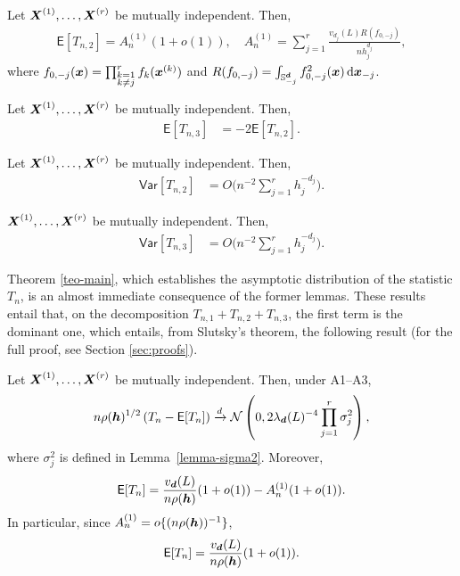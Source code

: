\documentclass[oneside,11pt]{article}
\begin{document}
\begin{lemma}\label{lemma-in2-e}
    Let $\boldsymbol{X}^{(1)}, \dots, \boldsymbol{X}^{(r)}$ be mutually independent. Then,
    \begin{align*}
    \mathsf{E}[T_{n,2}]=A_n^{(1)}(1+o(1))%
    ,\quad A_n^{(1)}=\sum_{j=1}^r \frac{v_{d_j}(L)R(f_{0,-j})}{nh_j^{d_j}},
\end{align*}
where $f_{0,-j}(\boldsymbol{x})=\prod_{\substack{k=1\\k\neq j}}^r f_k(\boldsymbol{x}^{(k)})$ and $R(f_{0,-j})=\int_{\mathbb{S}^{\boldsymbol{d}}_{-j}} f_{0,-j}^2(\boldsymbol{x})\,\mathrm{d} \boldsymbol{x}_{-j}$.
\end{lemma}

\begin{lemma}\label{lemma-in3-e}
    Let $\boldsymbol{X}^{(1)}, \dots, \boldsymbol{X}^{(r)}$ be mutually independent. Then,
    \begin{align*}
        \mathsf{E} [T_{n,3}] &=  -2 \mathsf{E} [T_{n,2}].
    \end{align*}
\end{lemma}

\begin{lemma}\label{lemma-var-tn2}
    Let $\boldsymbol{X}^{(1)}, \dots, \boldsymbol{X}^{(r)}$ be mutually independent. Then,
    \begin{align*}
        \mathsf{Var} [T_{n,2}] &=  O \Bigg(n^{-2} \sum_{j=1}^{r} h_j^{-d_j} \Bigg).
    \end{align*}
\end{lemma}

\begin{lemma}\label{lemma-var-tn3}
    $\boldsymbol{X}^{(1)}, \dots, \boldsymbol{X}^{(r)}$ be mutually independent. Then,
    \begin{align*}
        \mathsf{Var} [T_{n,3}] &=  O \Bigg(n^{-2} \sum_{j=1}^{r} h_j^{-d_j} \Bigg).
    \end{align*}
\end{lemma}

Theorem \ref{teo-main}, which establishes the asymptotic distribution of the statistic $T_n$, is an almost immediate consequence of the former lemmas. These results entail that, on the decomposition $T_{n,1} + T_{n,2} + T_{n,3}$, the first term is the dominant one, which entails, from Slutsky's theorem, the following result (for the full proof, see Section \ref{sec:proofs}).

\begin{theorem}\label{teo-main}
Let $\boldsymbol{X}^{(1)}, \dots, \boldsymbol{X}^{(r)}$ be mutually independent. Then, under A1--A3,
\[
    n\rho({\boldsymbol{h}})^{1/2}
    \left(T_n-\mathsf{E}[T_n]\right)
    \xrightarrow{d}
    \mathcal{N}\left(
        0,
        2\lambda_{\boldsymbol{d}}(L)^{-4}\prod_{j=1}^{r}\sigma_j^2
    \right),
\]
where $\sigma_j^2$ is defined in Lemma~\ref{lemma-sigma2}. Moreover,
\[
    \mathsf{E}[T_n]
    =
    \frac{v_{\boldsymbol{d}}(L)}{n\rho({\boldsymbol{h}})}(1+o(1))
    -
    A_n^{(1)}(1+o(1)).
\]
In particular, since $A_n^{(1)}=o\{(n\rho({\boldsymbol{h}}))^{-1}\}$,
\[
    \mathsf{E}[T_n]
    =
    \frac{v_{\boldsymbol{d}}(L)}{n\rho({\boldsymbol{h}})}(1+o(1)).
\]
\end{theorem}
\end{document}
